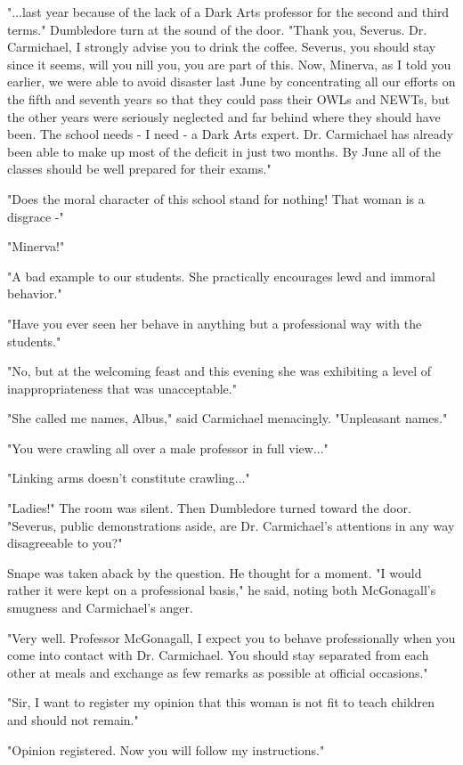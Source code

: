 \documentclass[a4paper,11pt]{article}
\begin{document}
"...last year because of the lack of a Dark Arts professor for the second and third terms." Dumbledore turn at the sound of the door. "Thank you, Severus. Dr. Carmichael, I strongly advise you to drink the coffee. Severus, you should stay since it seems, will you nill you, you are part of this. Now, Minerva, as I told you earlier, we were able to avoid disaster last June by concentrating all our efforts on the fifth and seventh years so that they could pass their OWLs and NEWTs, but the other years were seriously neglected and far behind where they should have been. The school needs - I need - a Dark Arts expert. Dr. Carmichael has already been able to make up most of the deficit in just two months. By June all of the classes should be well prepared for their exams."

"Does the moral character of this school stand for nothing! That woman is a disgrace -"

"Minerva!"

"A bad example to our students. She practically encourages lewd and immoral behavior."

"Have you ever seen her behave in anything but a professional way with the students."

"No, but at the welcoming feast and this evening she was exhibiting a level of inappropriateness that was unacceptable."

"She called me names, Albus," said Carmichael menacingly. "Unpleasant names."

"You were crawling all over a male professor in full view..."

"Linking arms doesn't constitute crawling..."

"Ladies!" The room was silent. Then Dumbledore turned toward the door. "Severus, public demonstrations aside, are Dr. Carmichael's attentions in any way disagreeable to you?"

Snape was taken aback by the question. He thought for a moment. "I would rather it were kept on a professional basis," he said, noting both McGonagall's smugness and Carmichael's anger.

"Very well. Professor McGonagall, I expect you to behave professionally when you come into contact with Dr. Carmichael. You should stay separated from each other at meals and exchange as few remarks as possible at official occasions."

"Sir, I want to register my opinion that this woman is not fit to teach children and should not remain."

"Opinion registered. Now you will follow my instructions."
\end{document}
